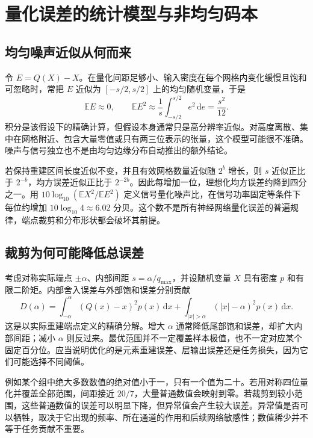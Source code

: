 \documentclass[UTF8,12pt,a4paper,fontset=fandol]{ctexart}
\begin{document}
\section{量化误差的统计模型与非均匀码本}
\label{sec:quant-distortion}

\subsection{均匀噪声近似从何而来}
令 $E=Q(X)-X$。在量化间距足够小、输入密度在每个网格内变化缓慢且饱和可忽略时，常把 $E$ 近似为 $[-s/2,s/2]$ 上的均匀随机变量，于是
\begin{equation}
 \mathbb E E\approx0,\qquad
 \mathbb E E^2\approx\frac1s\int_{-s/2}^{s/2}e^2\,\mathrm de=\frac{s^2}{12}.
 \label{eq:quant-uniform-noise}
\end{equation}
积分是该假设下的精确计算，但假设本身通常只是高分辨率近似。对高度离散、集中在网格附近、包含大量零值或只有两三位表示的张量，这个模型可能很不准确。噪声与信号独立也不是由均匀边缘分布自动推出的额外结论。

若保持重建区间长度近似不变，并且有效网格数量近似随 $2^b$ 增长，则 $s$ 近似正比于 $2^{-b}$，均方误差近似正比于 $2^{-2b}$。因此每增加一位，理想化均方误差约降到四分之一。用 $10\log_{10}(\mathbb E X^2/\mathbb E E^2)$ 定义信号量化噪声比，在信号功率固定等条件下每位约增加 $10\log_{10}4\approx6.02$ 分贝。这个数不是所有神经网络量化误差的普遍规律，端点裁剪和分布形状都会破坏其前提。

\subsection{裁剪为何可能降低总误差}
考虑对称实际端点 $\pm\alpha$、内部间距 $s=\alpha/q_{\max}$，并设随机变量 $X$ 具有密度 $p$ 和有限二阶矩。内部舍入误差与外部饱和误差分别贡献
\begin{equation}
 D(\alpha)=\int_{-\alpha}^{\alpha}(Q(x)-x)^2p(x)\,\mathrm dx
 +\int_{|x|>\alpha}(|x|-\alpha)^2p(x)\,\mathrm dx.
 \label{eq:quant-clipping-risk}
\end{equation}
这是以实际重建端点定义的精确分解。增大 $\alpha$ 通常降低尾部饱和误差，却扩大内部间距；减小 $\alpha$ 则反过来。最优范围并不一定覆盖样本极值，也不一定对应某个固定百分位。应当说明优化的是元素重建误差、层输出误差还是任务损失，因为它们可能选择不同阈值。

例如某个组中绝大多数数值的绝对值小于一，只有一个值为二十。若用对称四位量化并覆盖全部范围，间距接近 $20/7$，大量普通数值会映射到零。若裁剪到较小范围，这些普通数值的误差可以明显下降，但异常值会产生较大误差。异常值是否可以牺牲，取决于它出现的频率、所在通道的作用和后续网络敏感性；数值稀少并不等于任务贡献不重要。
\end{document}

